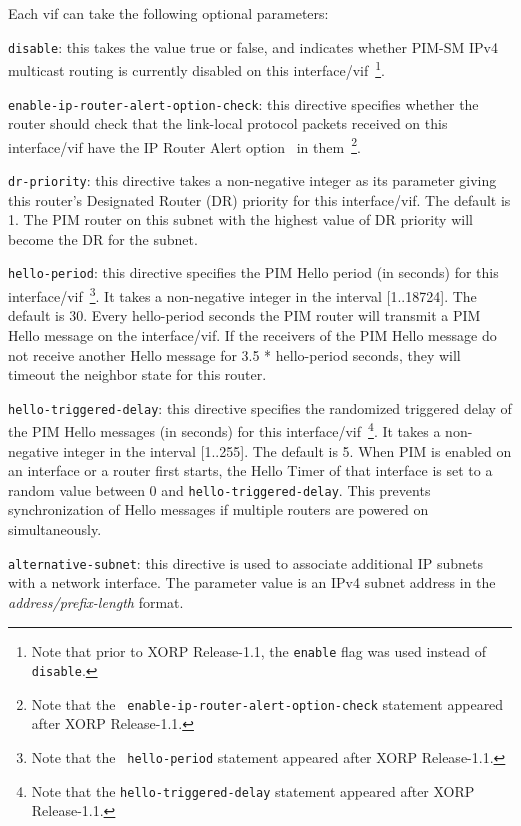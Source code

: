 \begin{description}
  Each {\stt vif} can take the following optional parameters:
\begin{description}
\item{\tt disable}: this takes the value {\stt true} or {\stt false},
  and indicates whether PIM-SM IPv4 multicast routing is currently
  disabled on this interface/vif~\footnote{Note
  that prior to XORP Release-1.1, the {\tt enable} flag was used instead of
  {\tt disable}.}.
\item{\tt enable-ip-router-alert-option-check}: this directive specifies
  whether the router should check that the link-local protocol packets
  received on this interface/vif have the IP Router Alert
  option~\cite{RFC2213} in them~\footnote{Note that the {\tt
  enable-ip-router-alert-option-check} statement appeared after XORP
  Release-1.1.}.
\item{\tt dr-priority}: this directive takes a non-negative integer as
  its parameter giving this router's Designated Router (DR) priority
  for this interface/vif.  The default is 1.  The PIM router on this
  subnet with the highest value of DR priority will become the DR for
  the subnet.
\item{\tt hello-period}: this directive specifies the PIM Hello period
  (in seconds) for this interface/vif~\footnote{Note that the {\tt
  hello-period} statement appeared after XORP Release-1.1.}. It takes a
  non-negative integer in the interval [1..18724].  The default is 30.
  Every {\stt hello-period} seconds the PIM router will transmit a PIM
  Hello message on the interface/vif. If the receivers of the PIM Hello
  message do not receive another Hello message for 3.5 * {\stt
  hello-period} seconds, they will timeout the neighbor state for this
  router.
\item{\tt hello-triggered-delay}: this directive specifies the randomized
  triggered delay of the PIM Hello messages (in seconds) for this
  interface/vif~\footnote{Note that the {\tt hello-triggered-delay} statement
  appeared after XORP Release-1.1.}. It takes a non-negative integer in the
  interval [1..255].  The default is 5. When PIM is enabled on an interface
  or a router first starts, the Hello Timer of that interface is set to a
  random value between 0 and {\tt hello-triggered-delay}.  This prevents
  synchronization of Hello messages if multiple routers are powered on
  simultaneously.
\item{\tt alternative-subnet}: this directive is used to associate
  additional IP subnets with a network interface. The parameter value
  is an IPv4 subnet address in the {\it address/prefix-length} format.


\end{description}
\end{description}
